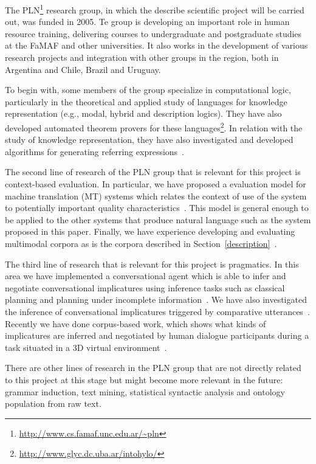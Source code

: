
The PLN\footnote{\url{http://www.cs.famaf.unc.edu.ar/~pln}} research group, 
in which the describe scientific project will be carried out, was funded in 2005.
Te group is developing an important role in human resource training,
delivering courses to undergraduate and postgraduate studies at the FaMAF and
other universities. It also works in the development of various research
projects and integration with other groups in the region, both in Argentina and
Chile, Brazil and Uruguay. 

To begin with, some members of the group specialize in computational
logic, particularly in the theoretical and applied study of languages for
knowledge representation (e.g., modal, hybrid and description logics). They
have also developed  automated theorem provers for these
languages\footnote{\url{http://www.glyc.dc.uba.ar/intohylo/}}. In relation with 
the study of knowledge representation, they have also investigated and developed
algorithms for generating referring expressions~\cite{AKS08}.

The second line of research of the PLN group that is relevant for this project
is context-based evaluation. In particular, we have proposed a evaluation model
for machine translation (MT) systems which relates the context of use of the
system to potentially important quality
characteristics~\cite{estr:impr08,estr:femt09}. This model is general enough to
be applied to the other systems that produce natural language such as the system
proposed in this paper. 
Finally, we have
experience developing and evaluating   
 multimodal corpora as is the corpora described in Section~\ref{description}~\cite{multieval}.

The third line of research that is relevant for this project is pragmatics. In
this area we have implemented a conversational agent which is able to infer and
negotiate conversational implicatures using inference tasks such as
classical planning and planning under incomplete information~\cite{benotti09b}.
We have also investigated the inference of conversational implicatures triggered
by comparative utterances~\cite{benotti09a}. Recently we have done corpus-based
work, which shows what kinds of implicatures are inferred and negotiated by
human dialogue participants during a task situated in a 3D
virtual environment~\cite{benotti09c}. 

There are other lines of research in the PLN group that are not directly related
to this project at this stage but might become more relevant in the
future: grammar induction, text mining, statistical syntactic analysis
and ontology population from raw text. 






